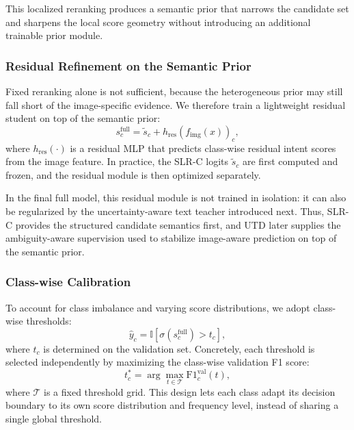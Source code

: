 This localized reranking produces a semantic prior that narrows the candidate set and sharpens the local score geometry without introducing an additional trainable prior module.

\subsubsection{Residual Refinement on the Semantic Prior}

Fixed reranking alone is not sufficient, because the heterogeneous prior may still fall short of the image-specific evidence. We therefore train a lightweight residual student on top of the semantic prior:
\begin{equation}
s^{\text{full}}_c = \tilde{s}_c + h_{\text{res}}(f_{\text{img}}(x))_c,
\end{equation}
where $h_{\text{res}}(\cdot)$ is a residual MLP that predicts class-wise residual intent scores from the image feature. In practice, the SLR-C logits $\tilde{s}_c$ are first computed and frozen, and the residual module is then optimized separately.

In the final full model, this residual module is not trained in isolation: it can also be regularized by the uncertainty-aware text teacher introduced next. Thus, SLR-C provides the structured candidate semantics first, and UTD later supplies the ambiguity-aware supervision used to stabilize image-aware prediction on top of the semantic prior.

\subsubsection{Class-wise Calibration}

To account for class imbalance and varying score distributions, we adopt class-wise thresholds:
\begin{equation}
\hat{y}_c = \mathbb{I}[\sigma(s^{\text{full}}_c) > t_c],
\end{equation}
where $t_c$ is determined on the validation set. Concretely, each threshold is selected independently by maximizing the class-wise validation F1 score:
\begin{equation}
t_c^\ast = \arg\max_{t \in \mathcal{T}} \text{F1}_c^{\text{val}}(t),
\end{equation}
where $\mathcal{T}$ is a fixed threshold grid. This design lets each class adapt its decision boundary to its own score distribution and frequency level, instead of sharing a single global threshold.

